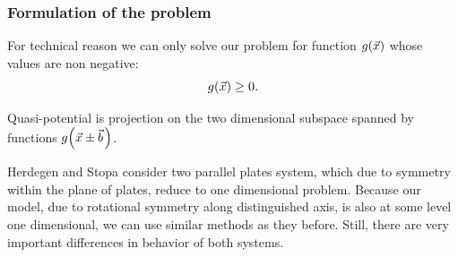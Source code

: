 \documentclass[10pt,t]{beamer}
\begin{document}
\begin{frame}
  \frametitle{Formulation of the problem}


  For technical reason we can only solve our problem for function
  $g( \vec{x} )$ whose values are non negative:
  \begin{equation}
    \label{eq:Scalar-field-and-two-quasi-deltas-03}
    g( \vec{x} ) \geq 0.
  \end{equation}

  \vspace{-2em}



  Quasi-potential is projection on the two dimensional subspace spanned by
  functions $g\!\left( \vec{x} \pm \vec{b} \hspace{0.11em} \right)$.

  Herdegen and Stopa consider two parallel plates system, which due to
  symmetry
  within the plane of plates, reduce to one dimensional problem.
  Because our model, due to rotational symmetry along distinguished axis, is
  also at some level one dimensional, we can use similar methods as
  they before. Still, there are very important differences in behavior
  of both systems.

\end{frame}
\end{document}
